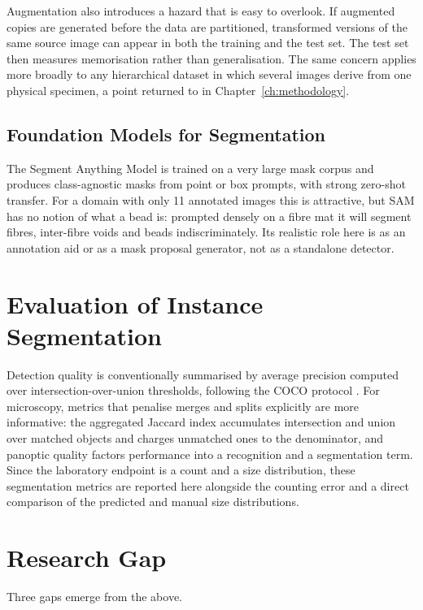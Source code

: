 Augmentation also introduces a hazard that is easy to overlook. If augmented copies
are generated before the data are partitioned, transformed versions of the same
source image can appear in both the training and the test set. The test set then
measures memorisation rather than generalisation. The same concern applies more
broadly to any hierarchical dataset in which several images derive from one physical
specimen, a point returned to in Chapter~\ref{ch:methodology}.

\subsection{Foundation Models for Segmentation}

The Segment Anything Model \cite{kirillov2023segment} is trained on a very large
mask corpus and produces class-agnostic masks from point or box prompts, with strong
zero-shot transfer. For a domain with only 11 annotated images this is attractive,
but SAM has no notion of what a bead is: prompted densely on a fibre mat it will
segment fibres, inter-fibre voids and beads indiscriminately. Its realistic role
here is as an annotation aid or as a mask proposal generator, not as a standalone
detector.

\section{Evaluation of Instance Segmentation}

Detection quality is conventionally summarised by average precision computed over
intersection-over-union thresholds, following the COCO protocol
\cite{lin2014microsoft}. For microscopy, metrics that penalise merges and splits
explicitly are more informative: the aggregated Jaccard index
\cite{kumar2017dataset} accumulates intersection and union over matched objects and
charges unmatched ones to the denominator, and panoptic quality
\cite{kirillov2019panoptic} factors performance into a recognition and a
segmentation term. Since the laboratory endpoint is a count and a size distribution,
these segmentation metrics are reported here alongside the counting error and a
direct comparison of the predicted and manual size distributions.

\section{Research Gap}

Three gaps emerge from the above.

